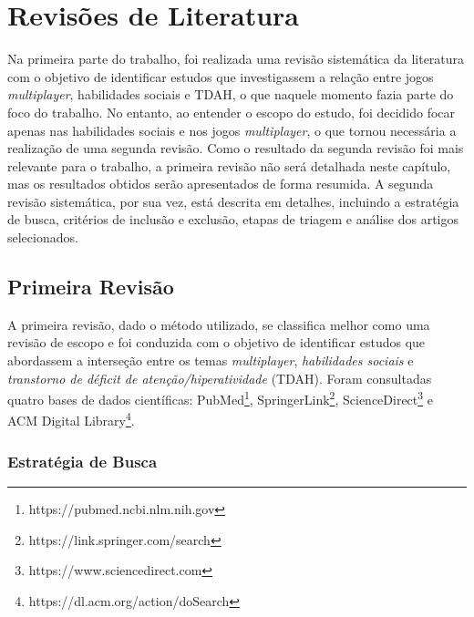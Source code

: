 \chapter{Revisões de Literatura}

Na primeira parte do trabalho, foi realizada uma revisão sistemática da literatura com o objetivo de identificar estudos que investigassem a relação entre jogos \textit{multiplayer}, habilidades sociais e TDAH, o que naquele momento fazia parte do foco do trabalho. No entanto, ao entender o escopo do estudo, foi decidido focar apenas nas habilidades sociais e nos jogos \textit{multiplayer}, o que tornou necessária a realização de uma segunda revisão.
Como o resultado da segunda revisão foi mais relevante para o trabalho, a primeira revisão não será detalhada neste capítulo, mas os resultados obtidos serão apresentados de forma resumida. A segunda revisão sistemática, por sua vez, está descrita em detalhes, incluindo a estratégia de busca, critérios de inclusão e exclusão, etapas de triagem e análise dos artigos selecionados.
\section{Primeira Revisão}

A primeira revisão, dado o método utilizado, se classifica melhor como uma revisão de escopo e foi conduzida com o objetivo de identificar estudos que abordassem a interseção entre os temas \textit{multiplayer}, \textit{habilidades sociais} e \textit{transtorno de déficit de atenção/hiperatividade} (TDAH). Foram consultadas quatro bases de dados científicas: PubMed\footnote{https://pubmed.ncbi.nlm.nih.gov}, SpringerLink\footnote{https://link.springer.com/search}, ScienceDirect\footnote{https://www.sciencedirect.com} e ACM Digital Library\footnote{https://dl.acm.org/action/doSearch}.


\subsection{Estratégia de Busca}

